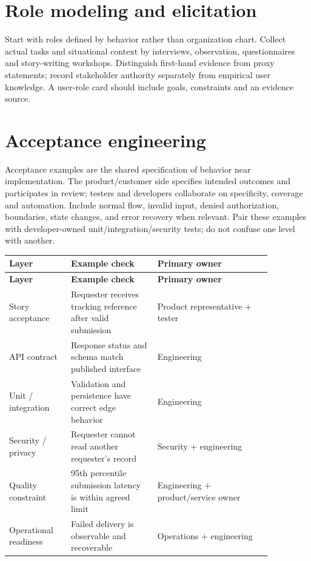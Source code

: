 \documentclass[11pt,letterpaper]{article}
\begin{document}
\section{Role modeling and elicitation}
Start with roles defined by behavior rather than organization chart. Collect actual tasks and situational context by interviews, observation, questionnaires and story-writing workshops. Distinguish first-hand evidence from proxy statements; record stakeholder authority separately from empirical user knowledge. A user-role card should include goals, constraints and an evidence source.

\section{Acceptance engineering}
Acceptance examples are the shared specification of behavior near implementation. The product/customer side specifies intended outcomes and participates in review; testers and developers collaborate on specificity, coverage and automation. Include normal flow, invalid input, denied authorization, boundaries, state changes, and error recovery when relevant. Pair these examples with developer-owned unit/integration/security tests; do not confuse one level with another.

\begin{longtable}{|p{0.20\linewidth}|p{0.29\linewidth}|p{0.37\linewidth}|}\hline
\textbf{Layer} & \textbf{Example check} & \textbf{Primary owner} \\ \hline\endfirsthead\hline
\textbf{Layer} & \textbf{Example check} & \textbf{Primary owner} \\ \hline\endhead
Story acceptance & Requester receives tracking reference after valid submission & Product representative + tester \\ \hline
API contract & Response status and schema match published interface & Engineering \\ \hline
Unit / integration & Validation and persistence have correct edge behavior & Engineering \\ \hline
Security / privacy & Requester cannot read another requester’s record & Security + engineering \\ \hline
Quality constraint & 95th percentile submission latency is within agreed limit & Engineering + product/service owner \\ \hline
Operational readiness & Failed delivery is observable and recoverable & Operations + engineering \\ \hline
\end{longtable}
\end{document}
